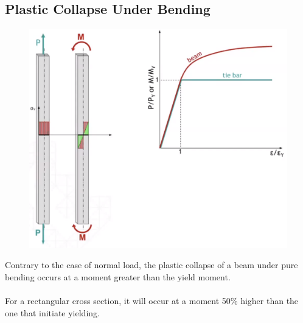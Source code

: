 \documentclass[class=report, crop=false, 12pt,a4paper]{standalone}
\begin{document}
\subsection{Plastic Collapse Under Bending}
\begin{figure}[H]
  \centering
  \includegraphics[width = 0.7 \textwidth]{../img/diagram2.PNG}
\end{figure}
Contrary to the case of normal load, the plastic collapse of a beam under pure bending occurs at a moment greater than the yield moment. \\\\
For a rectangular cross section, it will occur at a moment 50\% higher than the one that initiate yielding. 
\end{document}
